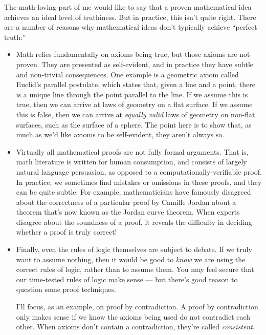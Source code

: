 \documentclass[9pt, twoside]{book}
\theoremstyle{argtstyle}
\begin{document}
The math-loving part of me would like to say that a proven mathematical idea
achieves an ideal level of truthiness. But in practice, this isn't quite
right. There are a number of reasons why mathematical ideas don't typically
achieve ``perfect truth:''
\begin{itemize}
    \item Math relies fundamentally on axioms being true, but those axioms are
        not proven. They are presented as self-evident, and in practice they
        have subtle and non-trivial consequences.
        One example is a geometric axiom called Euclid's parallel postulate,
        which states that, given a line and a point, there is a unique line
        through the point parallel to the line. If we assume this is true, then
        we can arrive at laws of geometry on a flat surface. If we assume this
        is false, then we can arrive at {\em equally valid} laws of geometry on
        non-flat surfaces, such as the surface of a sphere. The point here is to
        show that, as much as we'd like axioms to be self-evident, they aren't
        always so.
    \item Virtually all mathematical proofs are not fully formal
        arguments. That is, math literature is written for human consumption,
        and consists of largely natural language persuasion, as opposed to a
        computationally-verifiable proof. In practice, we sometimes find
        mistakes or omissions in these proofs, and they can be quite subtle. For
        example, mathematicians have famously disagreed about the correctness of a particular proof
        by Camille Jordan about a theorem that's now
        known as the Jordan curve theorem.
        When experts disagree about the soundness of
        a proof, it reveals the difficulty in
        deciding whether a proof is truly correct!
    \item Finally, even the rules of logic themselves are subject to debate. If
        we truly want to assume nothing, then it would be good to {\em know} we
        are using the correct rules of logic, rather than to assume them.
        You may feel secure that our time-tested rules of logic make sense ---
        but there's good reason to question some proof techniques.

        I'll focus, as an example, on proof by contradiction.
        A proof by contradiction
        only makes sense if we know the axioms being used do not contradict each
        other.
        When axioms don't contain a contradiction, they're called {\em
        consistent}.


\end{itemize}
\end{document}
